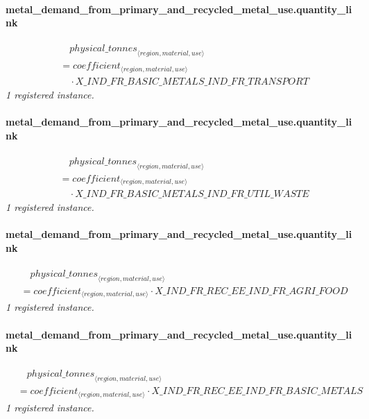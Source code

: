 \documentclass[11pt]{article}
\begin{document}
\paragraph{metal\_demand\_from\_primary\_and\_recycled\_metal\_use.quantity\_link}
\begin{align*}
&\quad {physical\_tonnes}_{\langle region, material, use\rangle}\\
&= coefficient_{\langle region, material, use\rangle}\\
&\quad {}\cdot X\_IND\_FR\_BASIC\_METALS\_IND\_FR\_TRANSPORT
\end{align*}
\noindent\emph{1 registered instance.}\par
\paragraph{metal\_demand\_from\_primary\_and\_recycled\_metal\_use.quantity\_link}
\begin{align*}
&\quad {physical\_tonnes}_{\langle region, material, use\rangle}\\
&= coefficient_{\langle region, material, use\rangle}\\
&\quad {}\cdot X\_IND\_FR\_BASIC\_METALS\_IND\_FR\_UTIL\_WASTE
\end{align*}
\noindent\emph{1 registered instance.}\par
\paragraph{metal\_demand\_from\_primary\_and\_recycled\_metal\_use.quantity\_link}
\begin{align*}
&\quad {physical\_tonnes}_{\langle region, material, use\rangle}\\
&= coefficient_{\langle region, material, use\rangle} \cdot X\_IND\_FR\_REC\_EE\_IND\_FR\_AGRI\_FOOD
\end{align*}
\noindent\emph{1 registered instance.}\par
\paragraph{metal\_demand\_from\_primary\_and\_recycled\_metal\_use.quantity\_link}
\begin{align*}
&\quad {physical\_tonnes}_{\langle region, material, use\rangle}\\
&= coefficient_{\langle region, material, use\rangle} \cdot X\_IND\_FR\_REC\_EE\_IND\_FR\_BASIC\_METALS
\end{align*}
\noindent\emph{1 registered instance.}\par
\end{document}
